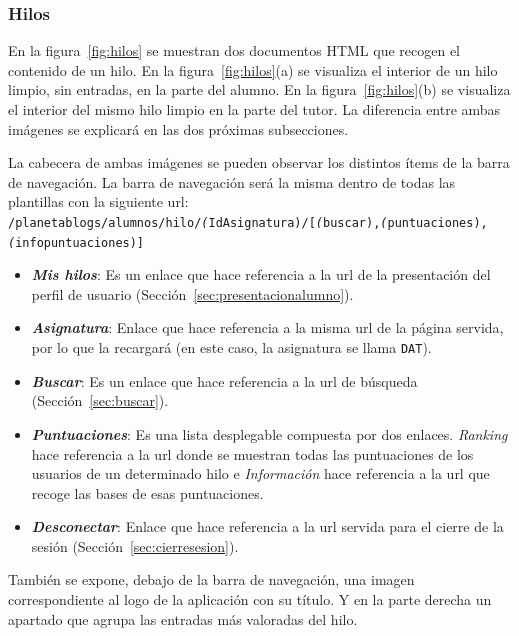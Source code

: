 \documentclass[a4paper, 12pt]{book}
\begin{document}
\subsubsection{Hilos} 
\label{sec:hilos}
En la figura~\ref{fig:hilos} se muestran dos documentos HTML que recogen el contenido de un hilo. En la figura~\ref{fig:hilos}(a) se visualiza el interior
de un hilo limpio, sin entradas, en la parte del alumno. En la figura~\ref{fig:hilos}(b) se visualiza el interior del mismo hilo limpio en la parte del 
tutor. La diferencia entre ambas im\'agenes se explicar\'a en las dos pr\'oximas subsecciones.

La cabecera de ambas im\'agenes se pueden observar los distintos \'items de la barra de navegaci\'on. La barra de navegaci\'on ser\'a la misma dentro de
todas las plantillas con la siguiente url: {\scriptsize \texttt{/planetablogs/alumnos/hilo/\textit(IdAsignatura)/[\textit(buscar),\textit(puntuaciones),
\textit(infopuntuaciones)]}}
\begin{itemize}
  \item {\bfseries \textit{Mis hilos}}: Es un enlace que hace referencia a la url de la presentaci\'on del perfil de usuario 
  (Secci\'on~\ref{sec:presentacionalumno}).
  \item {\bfseries \textit{Asignatura}}: Enlace que hace referencia a la misma url de la p\'agina servida, por lo que la recargar\'a (en este caso, 
  la asignatura se llama \texttt{DAT}).
  \item {\bfseries \textit{Buscar}}: Es un enlace que hace referencia a la url de b\'usqueda (Secci\'on~\ref{sec:buscar}).
  \item {\bfseries \textit{Puntuaciones}}: Es una lista desplegable compuesta por dos enlaces. \textit{Ranking} hace referencia a la url donde se muestran 
  todas las puntuaciones de los usuarios de un determinado hilo e \textit{Informaci\'on} hace referencia a la url que recoge las bases de esas puntuaciones.
  \item {\bfseries \textit{Desconectar}}: Enlace que hace referencia a la url servida para el cierre de la sesi\'on (Secci\'on~\ref{sec:cierresesion}).
\end{itemize}
Tambi\'en se expone, debajo de la barra de navegaci\'on, una imagen correspondiente al logo de la aplicaci\'on con su t\'itulo. Y en la parte derecha un 
apartado que agrupa las entradas m\'as valoradas del hilo.
\end{document}
